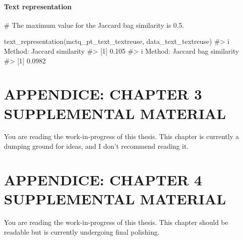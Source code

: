 \documentclass[
  12pt,
  a4paper,
  oneside]{tesesusp}
\newenvironment{Shaded}{\begin{snugshade}}{\end{snugshade}}
\newcommand{\CommentTok}[1]{\textcolor[rgb]{0.37,0.37,0.37}{#1}}
\newcommand{\FunctionTok}[1]{\textcolor[rgb]{0.28,0.35,0.67}{#1}}
\newcommand{\NormalTok}[1]{\textcolor[rgb]{0.00,0.23,0.31}{#1}}
\begin{document}
\hypertarget{text-representation-1}{%
\subsubsection{Text representation}\label{text-representation-1}}

\begin{Shaded}
\begin{Highlighting}[numbers=left,,]
\CommentTok{\# The maximum value for the Jaccard bag similarity is 0.5.}

\FunctionTok{text\_representation}\NormalTok{(mctq\_pt\_text\_textreuse, data\_text\_textreuse)}
\CommentTok{\#\textgreater{} i Method: Jaccard similarity}
\CommentTok{\#\textgreater{} [1] 0.105}
\CommentTok{\#\textgreater{} i Method: Jaccard bag similarity}
\CommentTok{\#\textgreater{} [1] 0.0982}
\end{Highlighting}
\end{Shaded}

\hypertarget{appendice-chapter-3-supplemental-material}{%
\chapter{APPENDICE: CHAPTER 3 SUPPLEMENTAL
MATERIAL}\label{appendice-chapter-3-supplemental-material}}

\begin{tcolorbox}[enhanced jigsaw, rightrule=.15mm, colback=white, colbacktitle=quarto-callout-important-color!10!white, toptitle=1mm, bottomtitle=1mm, toprule=.15mm, bottomrule=.15mm, colframe=quarto-callout-important-color-frame, opacitybacktitle=0.6, opacityback=0, coltitle=black, left=2mm, breakable, titlerule=0mm, title=\textcolor{quarto-callout-important-color}{\faExclamation}\hspace{0.5em}{Important}, arc=.35mm, leftrule=.75mm]

You are reading the work-in-progress of this thesis. This chapter is
currently a dumping ground for ideas, and I don't recommend reading it.

\end{tcolorbox}

\hypertarget{appendice-chapter-4-supplemental-material}{%
\chapter{APPENDICE: CHAPTER 4 SUPPLEMENTAL
MATERIAL}\label{appendice-chapter-4-supplemental-material}}

\begin{tcolorbox}[enhanced jigsaw, rightrule=.15mm, colback=white, colbacktitle=quarto-callout-note-color!10!white, toptitle=1mm, bottomtitle=1mm, toprule=.15mm, bottomrule=.15mm, colframe=quarto-callout-note-color-frame, opacitybacktitle=0.6, opacityback=0, coltitle=black, left=2mm, breakable, titlerule=0mm, title=\textcolor{quarto-callout-note-color}{\faInfo}\hspace{0.5em}{Note}, arc=.35mm, leftrule=.75mm]

You are reading the work-in-progress of this thesis. This chapter should
be readable but is currently undergoing final polishing.

\end{tcolorbox}
\end{document}
